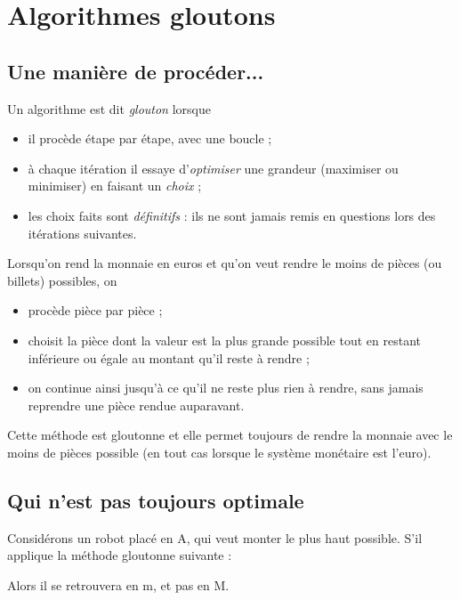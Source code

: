 \chapter{Algorithmes gloutons}
\section{Une manière de procéder...}

\begin{definition}
Un algorithme est dit \textit{glouton} lorsque
\begin{itemize}
	\item 	il procède étape par étape, avec une boucle ;
	\item 	à chaque itération il essaye d'\textit{optimiser} une grandeur (maximiser ou minimiser) en faisant un \textit{choix} ;
	\item 	les choix faits sont \textit{définitifs} : ils ne sont jamais remis en questions lors des itérations suivantes.	
\end{itemize}
\end{definition}

\begin{exemple}
Lorsqu'on rend la monnaie en euros et qu'on veut rendre le moins de pièces (ou billets) possibles, on
\begin{itemize}
\item 	procède pièce par pièce ;
\item  	choisit la pièce dont la valeur est la plus grande possible tout en restant inférieure ou égale au montant qu'il reste à rendre ;
\item 	on continue ainsi jusqu'à ce qu'il ne reste plus rien à rendre, sans jamais reprendre une pièce rendue auparavant.
\end{itemize}
Cette méthode est gloutonne et elle permet toujours de rendre la monnaie avec le moins de pièces possible (en tout cas lorsque le système monétaire est l'euro).
\end{exemple}
\section{Qui n'est pas toujours optimale}


Considérons un robot placé en A, qui veut monter le plus haut possible.
S'il applique la méthode gloutonne suivante :\medskip\par
{}\medskip\par
Alors il se retrouvera en m, et pas en M.

